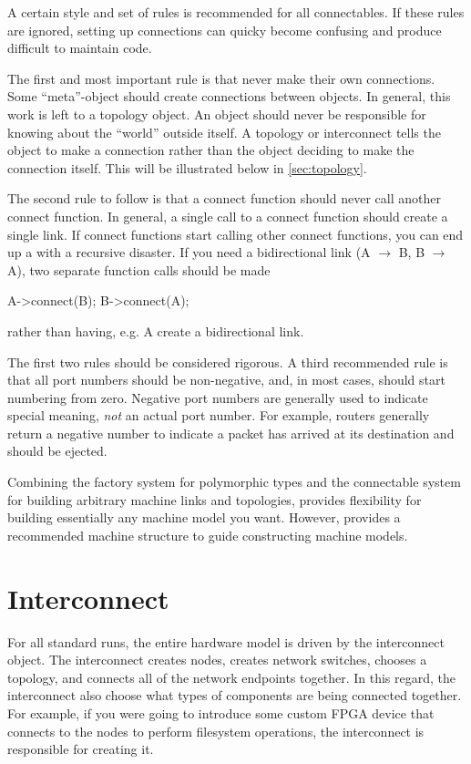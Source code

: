 A certain style and set of rules is recommended for all connectables.
If these rules are ignored, setting up connections can quicky become confusing and produce difficult to maintain code.

The first and most important rule is that  never make their own connections.
Some ``meta''-object should create connections between objects.
In general, this work is left to a topology object.
An object should never be responsible for knowing about the ``world'' outside itself.
A topology or interconnect tells the object to make a connection rather than the object deciding to make the connection itself.
This will be illustrated below in \ref{sec:topology}.

The second rule to follow is that a connect function should never call another connect function.
In general, a single call to a connect function should create a single link.
If connect functions start calling other connect functions, you can end up a with a recursive disaster.
If you need a bidirectional link (A $\rightarrow$ B, B $\rightarrow$ A),
two separate function calls should be made

\begin{CppCode}
A->connect(B);
B->connect(A);
\end{CppCode}

rather than having, e.g. A create a bidirectional link.

The first two rules should be considered rigorous. 
A third recommended rule is that all port numbers should be non-negative, and, in most cases, should start numbering from zero.
Negative port numbers are generally used to indicate special meaning, \emph{not} an actual port number.
For example, routers generally return a negative number to indicate a packet has arrived at its destination and should be ejected.

Combining the factory system for polymorphic types and the connectable system for building arbitrary machine links and topologies,
\sstmacro provides flexibility for building essentially any machine model you want.
However, \sstmacro provides a recommended machine structure to guide constructing machine models.

\section{Interconnect}\label{sec:topInterconnect}
For all standard runs, the entire hardware model is driven by the interconnect object.
The interconnect creates nodes, creates network switches, chooses a topology, and connects all of the network endpoints together.
In this regard, the interconnect also choose what types of components are being connected together.
For example, if you were going to introduce some custom FPGA device that connects to the nodes to perform filesystem operations,
the interconnect is responsible for creating it.

